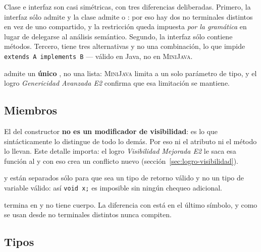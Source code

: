 Clase e interfaz son casi simétricas, con tres diferencias deliberadas. Primero, la interfaz sólo
admite  y la clase admite  o : por eso hay dos no terminales
distintos en vez de uno compartido, y la restricción queda impuesta \emph{por la gramática} en
lugar de delegarse al análisis semántico. Segundo, la interfaz sólo contiene métodos. Tercero,
 tiene tres alternativas y no una combinación, lo que impide
\texttt{extends A implements B} --- válido en Java, no en \textsc{MiniJava}.

 admite un \textbf{único} , no una lista: \textsc{MiniJava}
limita a un solo parámetro de tipo, y el logro \emph{Genericidad Avanzada E2} confirma que esa
limitación se mantiene.

\subsection{Miembros}

\begin{producciones}
\end{producciones}

El  del constructor \textbf{no es un modificador de visibilidad}: es lo que
sintácticamente lo distingue de todo lo demás. Por eso ni el atributo ni el método lo llevan. Este
detalle importa: el logro \emph{Visibilidad Mejorada E2} le saca esa función al  y con
eso crea un conflicto nuevo (sección~\ref{sec:logro-visibilidad}).

 y  están separados sólo para que  sea un tipo de retorno válido
y no un tipo de variable válido: así \texttt{void x;} es imposible sin ningún chequeo adicional.

 termina en \tl{;} y no tiene cuerpo. La diferencia con  está en el
último símbolo, y como se usan desde no terminales distintos nunca compiten.

\subsection{Tipos}

